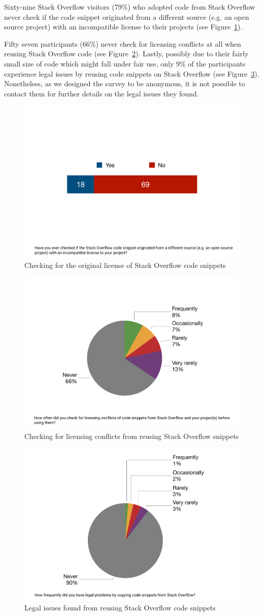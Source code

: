 \documentclass{svjour3}                     %
\begin{document}
Sixty-nine Stack Overflow visitors (79\%) who adopted code from Stack Overflow
never check if the code snippet originated from a different source (e.g. an open
source project) with an incompatible license to their projects (see
Figure~\ref{fig:survey_visitor_original_license}).

Fifty seven participants (66\%) never check for licensing conflicts at all
when reusing Stack Overflow code (see
Figure~\ref{fig:survey_visitor_licensing_conflict_check}). Lastly, possibly due
to their fairly small size of code which might fall under fair use, only 9\% of
the participants experience legal issues by reusing code snippets on Stack
Overflow (see Figure~\ref{fig:survey_visitor_legal_issue}). Nonetheless, as we designed the
survey to be anonymous, it is not possible to contact them for further details
on the legal issues they found.

\begin{figure} \centering
	\includegraphics[width=.4\linewidth]{survey_visitor_original_license} 
	\caption{Checking for the original license of Stack Overflow code snippets}
	\label{fig:survey_visitor_original_license} 
\end{figure}

\begin{figure} \centering
	\includegraphics[width=.4\linewidth]{survey_visitor_licensing_conflict_check} 
	\caption{Checking for licensing conflicts from reusing Stack Overflow snippets}
	\label{fig:survey_visitor_licensing_conflict_check} 
\end{figure}

\begin{figure} \centering
	\includegraphics[width=.4\linewidth]{survey_visitor_legal_issue} 
	\caption{Legal issues found from reusing Stack Overflow code snippets}
	\label{fig:survey_visitor_legal_issue} 
\end{figure}
\end{document}

